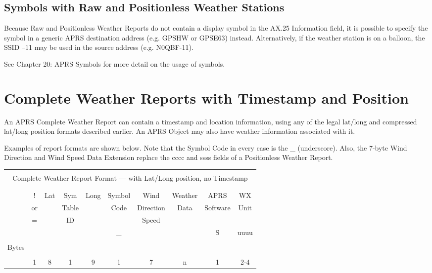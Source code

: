 \subsection {Symbols with Raw and Positionless Weather Stations}

Because Raw and Positionless Weather Reports do not contain a display
symbol in the AX.25 Information field, it is possible to specify the symbol in
a generic APRS destination address (e.g. GPSHW or GPSE63) instead.
Alternatively, if the weather station is on a balloon, the SSID –11 may be
used in the source address (e.g. N0QBF-11).

See Chapter 20: APRS Symbols for more detail on the usage of symbols.

\section {Complete Weather Reports with Timestamp and Position}

An APRS Complete Weather Report can contain a timestamp and location
information, using any of the legal lat/long and compressed lat/long position
formats described earlier. An APRS Object may also have weather
information associated with it.

Examples of report formats are shown below. Note that the Symbol Code in
every case is the \_ (underscore). Also, the 7-byte Wind Direction and Wind
Speed Data Extension replace the cccc and ssss fields of a Positionless
Weather Report.




\begin{tabular}{|l||c|c|c|c|c|c|c|c|c|}
  \hline 
    \multicolumn{10}{|c|}{ } \\
    \multicolumn{10}{|c|}{Complete Weather Report Format — with Lat/Long position, no Timestamp} \\
        \multicolumn{10}{|c|}{ }\\
  \hline
  & & & & & & & & & \\
  & !  & Lat & Sym & Long & Symbol & Wind & Weather & APRS & WX \\
  & or & & Table & & Code & Direction & Data & Software & Unit \\
  & = & & ID & & & Speed  & & & \\
  &  & & & & \_ & & & S & uuuu \\
  & & & & & & & & & \\
  \hline 
  Bytes & & & & & & & & & \\
  & & & & & & & & & \\
  & 1 & 8 & 1 & 9 & 1 & 7 & n & 1 & 2-4  \\
  \hline

\end{tabular}


